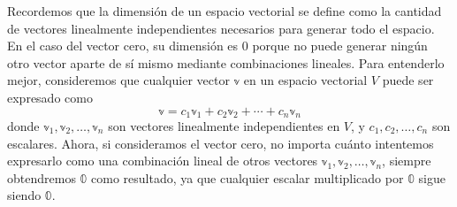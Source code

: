 Recordemos que la dimensión de un espacio vectorial se define como la cantidad de vectores linealmente independientes necesarios para generar todo el espacio. En el caso del vector cero, su dimensión es $0$ porque no puede generar ningún otro vector aparte de sí mismo mediante combinaciones lineales. Para entenderlo mejor, consideremos que cualquier vector $\mathbb{v}$ en un espacio vectorial $V$ puede ser expresado como
$$\mathbb{v} = c_1 \mathbb{v}_1 + c_2 \mathbb{v}_2 + \cdots + c_n \mathbb{v}_n$$
donde $\mathbb{v}_1, \mathbb{v}_2, \dots, \mathbb{v}_n$ son vectores linealmente independientes en $V$, y $c_1, c_2, \dots, c_n$ son escalares. Ahora, si consideramos el vector cero, no importa cuánto intentemos expresarlo como una combinación lineal de otros vectores $\mathbb{v}_1, \mathbb{v}_2, \dots, \mathbb{v}_n$, siempre obtendremos $\mathbb{0}$ como resultado, ya que cualquier escalar multiplicado por $\mathbb{0}$ sigue siendo $\mathbb{0}$.

\newpage

